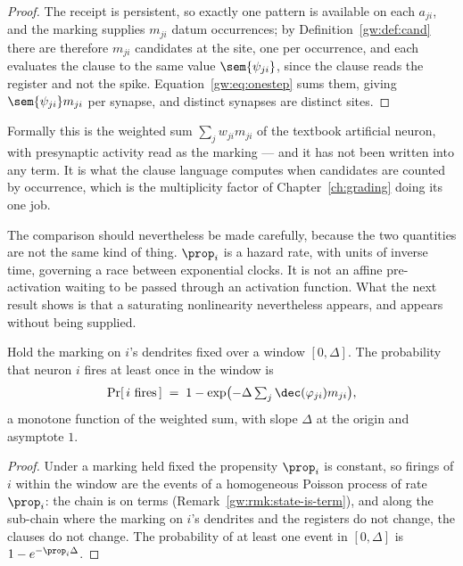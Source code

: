 \begin{proof}
The receipt is persistent, so exactly one pattern is available on each $a_{ji}$, and the
marking supplies $m_{ji}$ datum occurrences; by Definition~\ref{gw:def:cand} there are
therefore $m_{ji}$ candidates at the site, one per occurrence, and each evaluates the
clause to the same value $\sem{\psi_{ji}}$, since the clause reads the register and not
the spike. Equation~\eqref{gw:eq:onestep} sums them, giving $\sem{\psi_{ji}}m_{ji}$ per
synapse, and distinct synapses are distinct sites.
\end{proof}

Formally this is the weighted sum $\sum_j w_{ji}m_{ji}$ of the textbook artificial
neuron, with presynaptic activity read as the marking --- and it has not been written
into any term. It is what the clause language computes when candidates are counted by
occurrence, which is the multiplicity factor of Chapter~\ref{ch:grading} doing its one
job.

The comparison should nevertheless be made carefully, because the two quantities are not
the same kind of thing. $\prop_i$ is a hazard rate, with units of inverse time, governing
a race between exponential clocks. It is not an affine pre-activation waiting to be
passed through an activation function. What the next result shows is that a saturating
nonlinearity nevertheless appears, and appears without being supplied.

\begin{corollary}
\label{spk:cor:saturate}
Hold the marking on $i$'s dendrites fixed over a window $[0,\Delta]$. The probability
that neuron $i$ fires at least once in the window is
\[
  \Pr[\,i \text{ fires}\,] \;=\; 1 - \exp\bigl(-\Delta \textstyle\sum_j \dec(\varphi_{ji})m_{ji}\bigr),
\]
a monotone function of the weighted sum, with slope $\Delta$ at the origin and asymptote
$1$.
\end{corollary}

\begin{proof}
Under a marking held fixed the propensity $\prop_i$ is constant, so firings of $i$ within
the window are the events of a homogeneous Poisson process of rate $\prop_i$: the chain
is on terms (Remark~\ref{gw:rmk:state-is-term}), and along the sub-chain where the
marking on $i$'s dendrites and the registers do not change, the clauses do not change. The probability of at least one event in $[0,\Delta]$ is
$1 - e^{-\prop_i \Delta}$.
\end{proof}

